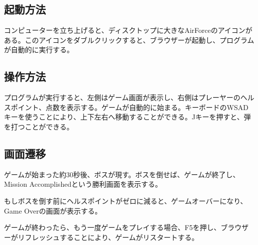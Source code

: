 \subsection{起動方法}
	コンピューターを立ち上げると、ディスクトップに大きなAirForceのアイコンがある。このアイコンをダブルクリックすると、ブラウザーが起動し、プログラムが自動的に実行する。
\subsection{操作方法}
	プログラムが実行すると、左側はゲーム画面が表示し、右側はプレーヤーのヘルスポイント、点数を表示する。ゲームが自動的に始まる。キーボードのWSADキーを使うことにより、上下左右へ移動することができる。Jキーを押すと、弾を打つことができる。
\subsection{画面遷移}
	ゲームが始まった約30秒後、ボスが現す。ボスを倒せば、ゲームが終了し、Mission Accomplishedという勝利画面を表示する。
	
	もしボスを倒す前にヘルスポイントがゼロに減ると、ゲームオーバーになり、Game Overの画面が表示する。
	
	ゲームが終わったら、もう一度ゲームをプレイする場合、F5を押し、ブラウザーがリフレッシュすることにより、ゲームがリスタートする。